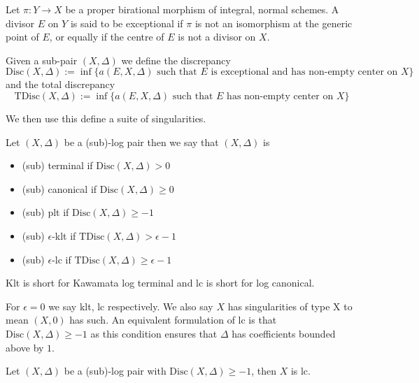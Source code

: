 \documentclass[a4paper,12pt]{book}
\begin{document}
\begin{definition}
	
	Let $\pi:Y \to X$ be a proper birational morphism of integral, normal schemes. A divisor $E$ on $Y$ is said to be exceptional if $\pi$ is not an isomorphism at the generic point of $E$, or equally if the centre of $E$ is not a divisor on $X$.
	
	Given a sub-pair $(X,\Delta)$ we define the discrepancy $$\text{Disc}(X,\Delta):=\inf \{a(E,X,\Delta) \text{ such that } E \text{ is exceptional and has non-empty center on } X\}$$
	and the total discrepancy 
	$$\text{TDisc}(X,\Delta):=\inf \{a(E,X,\Delta) \text { such that } E \text{ has non-empty center on } X\}$$
\end{definition}

We then use this define a suite of singularities.

\begin{definition}
	Let $(X,\Delta)$ be a (sub)-log pair then we say that $(X,\Delta)$ is
	\begin{itemize}
	\item 	(sub) terminal if $\text{Disc}(X,\Delta) > 0$
	\item	(sub) canonical if $\text{Disc}(X,\Delta)\geq 0$
	\item 	(sub) plt if $\text{Disc}(X,\Delta)\geq -1$
	\item	(sub) $\epsilon$-klt if $\text{TDisc}(X,\Delta) > \epsilon-1$
	\item	(sub) $\epsilon$-lc if $\text{TDisc}(X,\Delta) \geq \epsilon -1$
	\end{itemize}
\end{definition}

\begin{remark}
	
	Klt is short for Kawamata log terminal and lc is short for log canonical.
	\end{remark}

For $\epsilon=0$ we say klt, lc respectively. We also say $X$ has singularities of type X to mean $(X,0)$ has such. An equivalent formulation of lc is that $\text{Disc}(X,\Delta) \geq -1$ as this condition ensures that $\Delta$ has coefficients bounded above by $1$.

\begin{lemma}
	
	Let $(X,\Delta)$ be a (sub)-log pair with $\text{Disc}(X,\Delta) \geq -1$, then $X$ is lc.
	
	\end{lemma}
\end{document}
